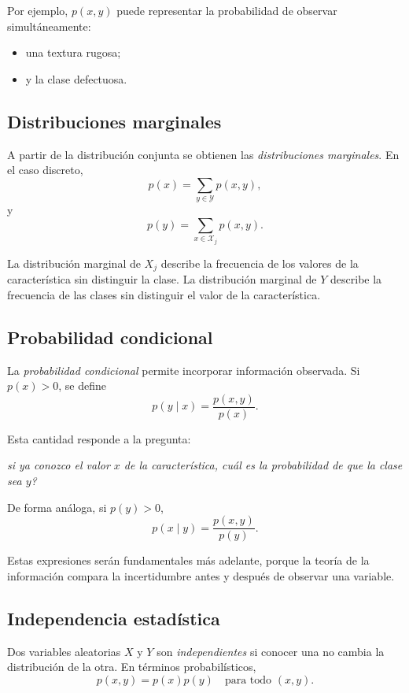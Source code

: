 \documentclass{article}
\begin{document}
Por ejemplo, \(p(x,y)\) puede representar la probabilidad de observar simultáneamente:

\begin{itemize}
\item una textura rugosa;
\item y la clase defectuosa.
\end{itemize}

\subsection{Distribuciones marginales}

A partir de la distribución conjunta se obtienen las \textit{distribuciones marginales}. En el caso discreto,
\[
p(x)=\sum_{y\in\mathcal{Y}} p(x,y),
\]
y
\[
p(y)=\sum_{x\in\mathcal{X}_j} p(x,y).
\]

La distribución marginal de \(X_j\) describe la frecuencia de los valores de la característica sin distinguir la clase. La distribución marginal de \(Y\) describe la frecuencia de las clases sin distinguir el valor de la característica.

\subsection{Probabilidad condicional}

La \textit{probabilidad condicional} permite incorporar información observada. Si \(p(x)>0\), se define
\[
p(y\mid x)=\frac{p(x,y)}{p(x)}.
\]

Esta cantidad responde a la pregunta:
\begin{center}
\emph{si ya conozco el valor \(x\) de la característica, cuál es la probabilidad de que la clase sea \(y\)?}
\end{center}

De forma análoga, si \(p(y)>0\),
\[
p(x\mid y)=\frac{p(x,y)}{p(y)}.
\]

Estas expresiones serán fundamentales más adelante, porque la teoría de la información compara la incertidumbre antes y después de observar una variable.

\subsection{Independencia estadística}

Dos variables aleatorias \(X\) y \(Y\) son \textit{independientes} si conocer una no cambia la distribución de la otra. En términos probabilísticos,
\[
p(x,y)=p(x)p(y)
\quad \text{para todo } (x,y).
\]
\end{document}
